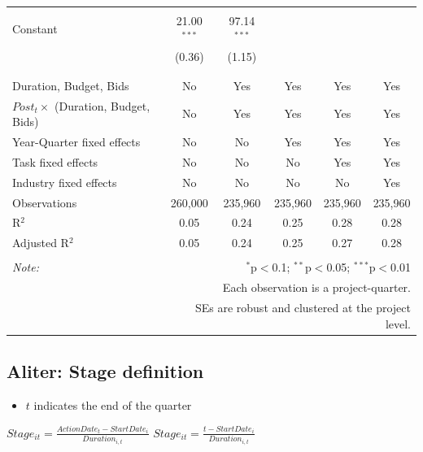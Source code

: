\documentclass[
]{article}
\providecommand{\tightlist}{%
  \setlength{\itemsep}{0pt}\setlength{\parskip}{0pt}}
\begin{document}
\begin{table}[H]
\begin{tabular}{@{\extracolsep{-2pt}}lccccc}
  & & & & & \\ 
 Constant & 21.00$^{***}$ & 97.14$^{***}$ &  &  &  \\ 
  & (0.36) & (1.15) &  &  &  \\ 
  & & & & & \\ 
\hline \\[-1.8ex] 
Duration, Budget, Bids & No & Yes & Yes & Yes & Yes \\ 
$Post_t \times $  (Duration, Budget, Bids) & No & Yes & Yes & Yes & Yes \\ 
Year-Quarter fixed effects & No & No & Yes & Yes & Yes \\ 
Task fixed effects & No & No & No & Yes & Yes \\ 
Industry fixed effects & No & No & No & No & Yes \\ 
Observations & 260,000 & 235,960 & 235,960 & 235,960 & 235,960 \\ 
R$^{2}$ & 0.05 & 0.24 & 0.25 & 0.28 & 0.28 \\ 
Adjusted R$^{2}$ & 0.05 & 0.24 & 0.25 & 0.27 & 0.28 \\ 
\hline 
\hline \\[-1.8ex] 
\textit{Note:}  & \multicolumn{5}{r}{$^{*}$p$<$0.1; $^{**}$p$<$0.05; $^{***}$p$<$0.01} \\ 
 & \multicolumn{5}{r}{Each observation is a project-quarter.} \\ 
 & \multicolumn{5}{r}{SEs are robust and clustered at the project level.} \\ 
\end{tabular} 
\end{table}

\hypertarget{aliter-stage-definition}{%
\subsection{Aliter: Stage definition}\label{aliter-stage-definition}}

\begin{itemize}
\tightlist
\item
  \(t\) indicates the end of the quarter
\end{itemize}

\(Stage_{it}=\frac{ActionDate_{t}-StartDate_i}{Duration_{i,t}}\)
\(Stage_{it}=\frac{t-StartDate_i}{Duration_{i,t}}\)
\end{document}
